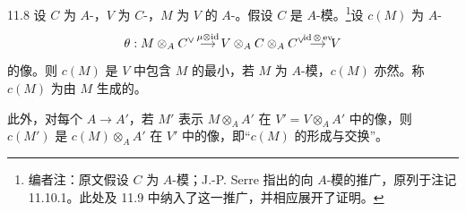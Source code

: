 \begin{SGAresult}{}{11.8}
设 $C$ 为 $A$-，$V$ 为 $C$-，$M$ 为 $V$ 的 $A$-。假设 $C$ 是 $A$-模。\footnote{编者注：原文假设 $C$ 为 $A$-模；J.-P. Serre 指出的向 $A$-模的推广，原列于注记 11.10.1。此处及 11.9 中纳入了这一推广，并相应展开了证明。}设 $c(M)$ 为 $A$-
\[
\begin{tikzcd}[column sep=small]
\theta:M\otimes_A C^\vee\arrow[r,"\mu\otimes\operatorname{id}"]&V\otimes_A C\otimes_A C^\vee\arrow[r,"\operatorname{id}\otimes\operatorname{ev}"]&V
\end{tikzcd}
\]
的像。则 $c(M)$ 是 $V$ 中包含 $M$ 的最小，若 $M$ 为 $A$-模，$c(M)$ 亦然。称 $c(M)$ 为由 $M$ 生成的。

此外，对每个 $A\to A'$，若 $M'$ 表示 $M\otimes_A A'$ 在 $V'=V\otimes_A A'$ 中的像，则 $c(M')$ 是 $c(M)\otimes_A A'$ 在 $V'$ 中的像，即“$c(M)$ 的形成与交换”。
\end{SGAresult}
